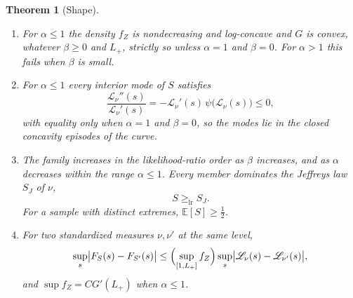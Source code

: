 \documentclass[sn-mathphys-num]{sn-jnl}\newcommand{\SNJNL}{}
\theoremstyle{thmstyleone}
\newtheorem{theorem}{Theorem}
\theoremstyle{thmstyletwo}
\theoremstyle{thmstylethree}
\theoremstyle{thmstyleone}
\providecommand{\E}{\mathbb{E}}
\providecommand{\Leh}{\mathscr{L}}
\providecommand{\lr}{\mathrm{lr}}
\begin{document}
	\begin{theorem}[Shape]\label{thm:shape}\leavevmode
		\begin{enumerate}[label=\textup{(\roman*)},leftmargin=2.2em]
			\item For $\alpha\le1$ the density $f_Z$ is nondecreasing and
			log-concave and $G$ is convex, whatever $\beta\ge0$ and $L_+$,
			strictly so unless $\alpha=1$ and $\beta=0$. For $\alpha>1$ this
			fails when $\beta$ is small.
			\item For $\alpha\le1$ every interior mode of $S$ satisfies
			\begin{equation}\label{eq:modeeq}
				\frac{\Leh_\nu''(s)}{\Leh_\nu'(s)}=-\Leh_\nu'(s)\,\psi\bigl(\Leh_\nu(s)\bigr)\le0 ,
			\end{equation}
			with equality only when $\alpha=1$ and $\beta=0$, so the modes
			lie in the closed concavity episodes of the curve.
			\item The family increases in the likelihood-ratio order as $\beta$
			increases, and as $\alpha$ decreases within the range
			$\alpha\le1$. Every member dominates the Jeffreys law $S_J$ of
			$\nu$,
			\begin{equation}\label{eq:lrjeffreys}
				S\ge_{\lr}S_J .
			\end{equation}
			For a sample with distinct extremes, $\E[S]\ge\tfrac12$.
			\item For two standardized measures $\nu,\nu'$ at the same level,
			\begin{equation}\label{eq:kolmogorov}
				\sup_s\bigl|F_S(s)-F_{S'}(s)\bigr|
				\le\Bigl(\sup_{[1,L_+]}f_Z\Bigr)\sup_s\bigl|\Leh_\nu(s)-\Leh_{\nu'}(s)\bigr| ,
			\end{equation}
			and $\sup f_Z=CG'(L_+)$ when $\alpha\le1$.
		\end{enumerate}
	\end{theorem}
	
\end{document}
